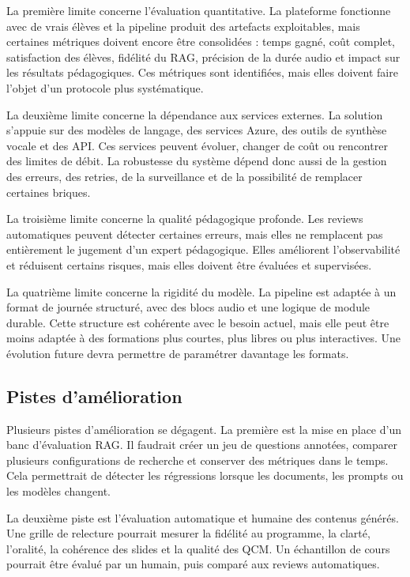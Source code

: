 La première limite concerne l'évaluation quantitative. La plateforme fonctionne avec de
vrais élèves et la pipeline produit des artefacts exploitables, mais certaines métriques
doivent encore être consolidées : temps gagné, coût complet, satisfaction des élèves,
fidélité du RAG, précision de la durée audio et impact sur les résultats pédagogiques.
Ces métriques sont identifiées, mais elles doivent faire l'objet d'un protocole plus
systématique.

La deuxième limite concerne la dépendance aux services externes. La solution s'appuie
sur des modèles de langage, des services Azure, des outils de synthèse vocale et des API.
Ces services peuvent évoluer, changer de coût ou rencontrer des limites de débit. La
robustesse du système dépend donc aussi de la gestion des erreurs, des retries, de la
surveillance et de la possibilité de remplacer certaines briques.

La troisième limite concerne la qualité pédagogique profonde. Les reviews automatiques
peuvent détecter certaines erreurs, mais elles ne remplacent pas entièrement le jugement
d'un expert pédagogique. Elles améliorent l'observabilité et réduisent certains risques,
mais elles doivent être évaluées et supervisées.

La quatrième limite concerne la rigidité du modèle. La pipeline est adaptée à un format
de journée structuré, avec des blocs audio et une logique de module durable. Cette
structure est cohérente avec le besoin actuel, mais elle peut être moins adaptée à des
formations plus courtes, plus libres ou plus interactives. Une évolution future devra
permettre de paramétrer davantage les formats.

\subsection{Pistes d'amélioration}

Plusieurs pistes d'amélioration se dégagent. La première est la mise en place d'un banc
d'évaluation RAG. Il faudrait créer un jeu de questions annotées, comparer plusieurs
configurations de recherche et conserver des métriques dans le temps. Cela permettrait
de détecter les régressions lorsque les documents, les prompts ou les modèles changent.

La deuxième piste est l'évaluation automatique et humaine des contenus générés. Une
grille de relecture pourrait mesurer la fidélité au programme, la clarté, l'oralité, la
cohérence des slides et la qualité des QCM. Un échantillon de cours pourrait être évalué
par un humain, puis comparé aux reviews automatiques.

